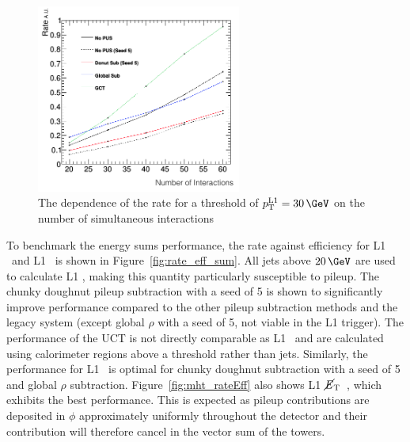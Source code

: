 \begin{figure}
\centering
    \includegraphics[width=0.6\textwidth]{./Figures/triggerUpgrade/neutrinonvtx_jet1}
  \caption{The dependence of the rate for a threshold of $\Lonept=30\,\GeV$ on the number of simultaneous interactions}
  \label{fig:rate_nvtx}
\end{figure}

To benchmark the energy sums performance, the rate against efficiency for L1 \scalht~and L1 \mht~is shown in Figure~\ref{fig:rate_eff_sum}.
All jets above $20\,\GeV$ are used to calculate L1 \scalht, making this quantity particularly susceptible to pileup. The chunky doughnut 
pileup subtraction with a seed of 5 is shown to significantly improve performance compared to the other pileup subtraction
methods and the legacy system (except global $\rho$ with a seed of 5, not viable in the L1 trigger). The performance of the UCT is not 
directly comparable as L1 \scalht~and \mht are calculated using calorimeter regions above a threshold rather than jets. Similarly, the performance for 
L1 \mht~is optimal for chunky doughnut subtraction with a seed of 5 and global $\rho$ subtraction. 
Figure~\ref{fig:mht_rateEff} also shows L1 $\mbox{$\cancel{E}_\text{T}$}$~, which exhibits the best performance. This is expected as 
pileup contributions are deposited in $\phi$ approximately uniformly throughout the detector and their contribution will
therefore cancel in the vector sum of the towers.

